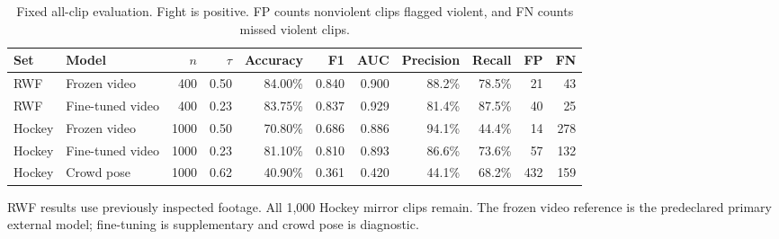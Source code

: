 \begin{table}[t]
\caption{Fixed all-clip evaluation. Fight is positive. FP counts nonviolent clips flagged violent, and FN counts missed violent clips.}
\label{tab:evaluation}\centering
\begin{tabular}{llrrrrrrrrr}
\toprule
Set & Model & $n$ & $\tau$ & Accuracy & F1 & AUC & Precision & Recall & FP & FN\\
\midrule
RWF & Frozen video & 400 & 0.50 & 84.00\% & 0.840 & 0.900 & 88.2\% & 78.5\% & 21 & 43\\
RWF & Fine-tuned video & 400 & 0.23 & 83.75\% & 0.837 & 0.929 & 81.4\% & 87.5\% & 40 & 25\\
Hockey & Frozen video & 1000 & 0.50 & 70.80\% & 0.686 & 0.886 & 94.1\% & 44.4\% & 14 & 278\\
Hockey & Fine-tuned video & 1000 & 0.23 & 81.10\% & 0.810 & 0.893 & 86.6\% & 73.6\% & 57 & 132\\
Hockey & Crowd pose & 1000 & 0.62 & 40.90\% & 0.361 & 0.420 & 44.1\% & 68.2\% & 432 & 159\\
\bottomrule
\end{tabular}
\par\smallskip\parbox{\textwidth}{\footnotesize RWF results use previously inspected footage. All 1,000 Hockey mirror clips remain. The frozen video reference is the predeclared primary external model; fine-tuning is supplementary and crowd pose is diagnostic.}
\end{table}
